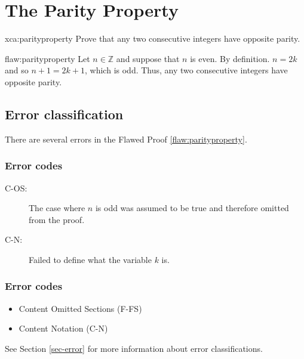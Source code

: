 \clearpage
\section{The Parity Property}

\begin{xca}[]{xca:parityproperty}
Prove that any two consecutive integers have opposite parity. 
\end{xca}

\begin{flaw}{flaw:parityproperty}
Let $n \in \mathbb{Z}$ and suppose that $n$ is even. By definition. $n=2k$ and so $n+1 = 2k+1$, which is odd. Thus, any two consecutive integers have opposite parity. 
\end{flaw}

\clearpage
\subsection{Error classification}


There are several errors
 in the Flawed Proof \ref{flaw:parityproperty}. 
 
\subsubsection{Error codes}

\begin{description}
 	\item[C-OS:] The case where $n$ is odd was assumed to be true and therefore omitted from the proof.  
 	\item[C-N:] Failed to define what the variable $k$ is. 
 \end{description}

\subsubsection{Error codes}
\begin{itemize}
	\item 	Content Omitted Sections (F-FS)
	\item   Content Notation (C-N)
\end{itemize}
See Section \ref{sec-error} for more information about error classifications.

